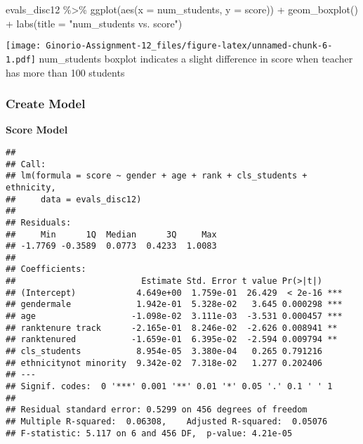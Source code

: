 \documentclass[
]{article}
\newenvironment{Shaded}{\begin{snugshade}}{\end{snugshade}}
\newcommand{\AttributeTok}[1]{\textcolor[rgb]{0.77,0.63,0.00}{#1}}
\newcommand{\DecValTok}[1]{\textcolor[rgb]{0.00,0.00,0.81}{#1}}
\newcommand{\FunctionTok}[1]{\textcolor[rgb]{0.00,0.00,0.00}{#1}}
\newcommand{\NormalTok}[1]{#1}
\newcommand{\OtherTok}[1]{\textcolor[rgb]{0.56,0.35,0.01}{#1}}
\newcommand{\SpecialCharTok}[1]{\textcolor[rgb]{0.00,0.00,0.00}{#1}}
\newcommand{\StringTok}[1]{\textcolor[rgb]{0.31,0.60,0.02}{#1}}
\begin{document}
\begin{Shaded}
\end{Shaded}

\begin{Shaded}
\begin{Highlighting}[]
\NormalTok{evals\_disc12 }\SpecialCharTok{\%\textgreater{}\%} 
  \FunctionTok{ggplot}\NormalTok{(}\FunctionTok{aes}\NormalTok{(}\AttributeTok{x =}\NormalTok{ num\_students, }\AttributeTok{y =}\NormalTok{ score)) }\SpecialCharTok{+}
  \FunctionTok{geom\_boxplot}\NormalTok{() }\SpecialCharTok{+} 
  \FunctionTok{labs}\NormalTok{(}\AttributeTok{title =} \StringTok{"num\_students vs. score"}\NormalTok{)}
\end{Highlighting}
\end{Shaded}

\texttt{[image: Ginorio-Assignment-12\_files/figure-latex/unnamed-chunk-6-1.pdf]}
num\_students boxplot indicates a slight difference in score when
teacher has more than 100 students

\hypertarget{create-model}{%
\subsubsection{Create Model}\label{create-model}}

\textbf{Score Model}

\begin{verbatim}
## 
## Call:
## lm(formula = score ~ gender + age + rank + cls_students + ethnicity, 
##     data = evals_disc12)
## 
## Residuals:
##     Min      1Q  Median      3Q     Max 
## -1.7769 -0.3589  0.0773  0.4233  1.0083 
## 
## Coefficients:
##                         Estimate Std. Error t value Pr(>|t|)    
## (Intercept)            4.649e+00  1.759e-01  26.429  < 2e-16 ***
## gendermale             1.942e-01  5.328e-02   3.645 0.000298 ***
## age                   -1.098e-02  3.111e-03  -3.531 0.000457 ***
## ranktenure track      -2.165e-01  8.246e-02  -2.626 0.008941 ** 
## ranktenured           -1.659e-01  6.395e-02  -2.594 0.009794 ** 
## cls_students           8.954e-05  3.380e-04   0.265 0.791216    
## ethnicitynot minority  9.342e-02  7.318e-02   1.277 0.202406    
## ---
## Signif. codes:  0 '***' 0.001 '**' 0.01 '*' 0.05 '.' 0.1 ' ' 1
## 
## Residual standard error: 0.5299 on 456 degrees of freedom
## Multiple R-squared:  0.06308,    Adjusted R-squared:  0.05076 
## F-statistic: 5.117 on 6 and 456 DF,  p-value: 4.21e-05
\end{verbatim}
\end{document}
